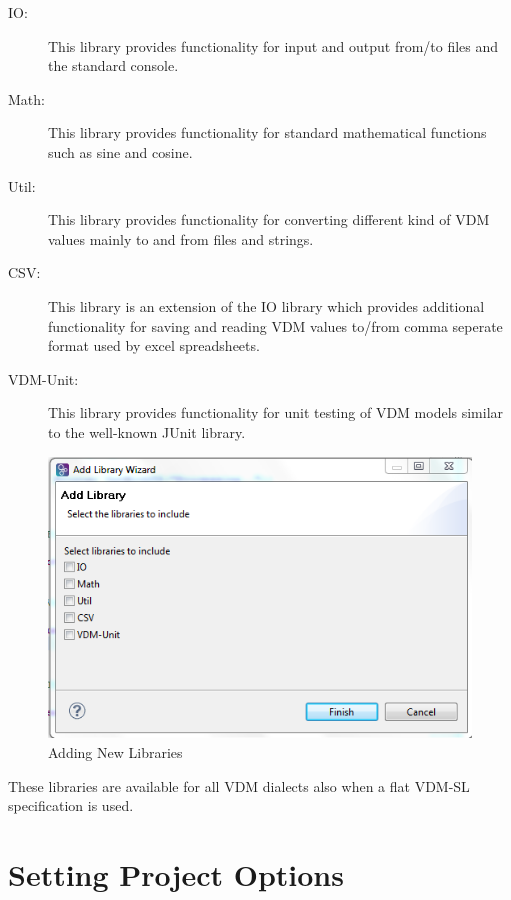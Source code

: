 \documentclass{overturerepchap}
\begin{document}
\begin{description}
\item[IO:] This library provides functionality for input and output
  from/to files and the standard console.
\item[Math:] This library provides functionality for standard
  mathematical functions such as sine and cosine.
\item[Util:] This library provides functionality for converting
  different kind of VDM values mainly to and from files and strings.
\item[CSV:] This library is an extension of the IO library which
  provides additional functionality for saving and reading VDM values
  to/from comma seperate format used by excel spreadsheets.
\item[VDM-Unit:] This library provides functionality for unit testing
  of VDM models similar to the well-known JUnit library.
\end{description}

\begin{figure}[!htb]
	\begin{center}
	  \includegraphics[scale=0.8]{figures/NewLibraries}
	  \caption[Adding New Libraries]{Adding New Libraries}
	  \label{fig:NewLibraries}
	\end{center}
\end{figure}

These libraries are available for all VDM dialects also when a flat
VDM-SL specification is used.

\section{Setting Project Options}\label{subsec:options}
\end{document}
